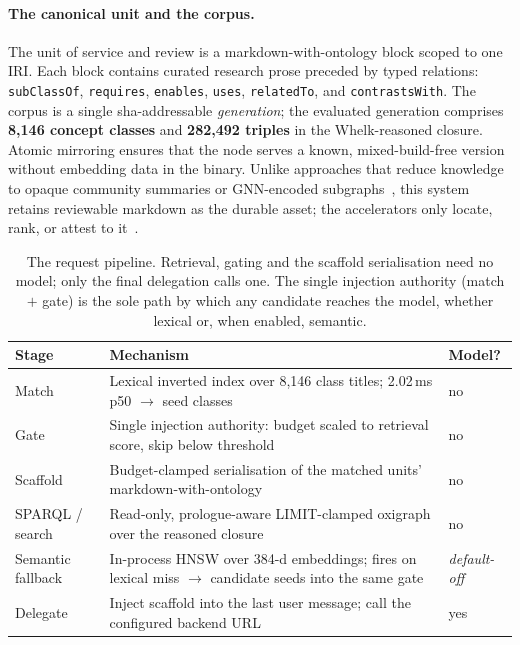 \documentclass[10pt,twocolumn]{article}
\begin{document}
\paragraph{The canonical unit and the corpus.} The unit of service and review is a markdown-with-ontology block scoped to one IRI. Each block contains curated research prose preceded by typed relations: \texttt{subClassOf}, \texttt{requires}, \texttt{enables}, \texttt{uses}, \texttt{relatedTo}, and \texttt{contrastsWith}. The corpus is a single sha-addressable \emph{generation}; the evaluated generation comprises \textbf{8{,}146 concept classes} and \textbf{282{,}492 triples} in the Whelk-reasoned closure. Atomic mirroring ensures that the node serves a known, mixed-build-free version without embedding data in the binary. Unlike approaches that reduce knowledge to opaque community summaries or GNN-encoded subgraphs~\cite{edge2024graphrag,he2024gretriever}, this system retains reviewable markdown as the durable asset; the accelerators only locate, rank, or attest to it~\cite{garcez2023neurosymbolic}.

\begin{table}[t]\centering\small
\caption{The request pipeline. Retrieval, gating and the scaffold serialisation need no model; only
the final delegation calls one. The single injection authority (match $+$ gate) is the sole path by
which any candidate reaches the model, whether lexical or, when enabled, semantic.}
\label{tab:pipeline}
\renewcommand{\arraystretch}{1.15}
\begin{tabularx}{\textwidth}{@{}>{\raggedright\arraybackslash}p{2.7cm} >{\raggedright\arraybackslash}X >{\centering\arraybackslash}p{2.2cm}@{}}
\toprule
Stage & Mechanism & Model? \\
\midrule
Match & Lexical inverted index over 8{,}146 class titles; 2.02\,ms p50 $\to$ seed classes & no \\
Gate & Single injection authority: budget scaled to retrieval score, skip below threshold & no \\
Scaffold & Budget-clamped serialisation of the matched units' markdown-with-ontology & no \\
SPARQL / search & Read-only, prologue-aware LIMIT-clamped oxigraph over the reasoned closure & no \\
Semantic fallback & In-process HNSW over 384-d embeddings; fires on lexical miss $\to$ candidate seeds into the same gate & \emph{default-off} \\
Delegate & Inject scaffold into the last user message; call the configured backend URL & yes \\
\bottomrule
\end{tabularx}
\end{table}
\end{document}
